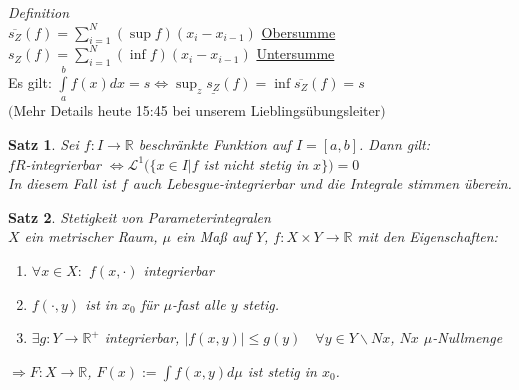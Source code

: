 \documentclass[11pt]{memoir}
\theoremstyle{changebreak}
\newtheorem{Satz}{Satz}[chapter]
\begin{document}
\emph{Definition} \\
$\overline{s_Z}(f) = \sum\limits_{i=1}^N (\sup f)(x_i  - x_{i-1})$ \underline{Obersumme} \\
\underline{$s_Z$}$(f) = \sum\limits_{i=1}^N (\inf f)(x_i - x_{i-1})$ \underline{Untersumme} \\
Es gilt:
$\int\limits_a^b f(x) dx = s \Leftrightarrow \sup_z \underline{s_Z}(f) = \inf \overline{s_Z}(f) = s$ \\
$($Mehr Details heute 15:45 bei unserem Lieblingsübungsleiter$)$

\begin{Satz}
Sei $f: I \rightarrow \mathbb R$ beschränkte Funktion auf $I = [a, b]$. Dann gilt: \\
$f R$-integrierbar $\Leftrightarrow \mathscr L^1(\{x \in I | f $ ist nicht stetig in $x \}) = 0$ \\
In diesem Fall ist $f$ auch Lebesgue-integrierbar und die Integrale stimmen überein.
\end{Satz}



\begin{Satz}
\emph{Stetigkeit von Parameterintegralen} \\
$X$ ein metrischer Raum, $\mu$ ein Maß auf $Y$, $f: X \times Y \rightarrow \mathbb R$ mit den Eigenschaften:
\begin{enumerate}
	\item $\forall x \in X:$ $f(x, \cdotp)$ integrierbar
	\item $f(\cdotp, y)$ ist in $x_0$ für $\mu$-fast alle $y$ stetig.
	\item $\exists g: Y \rightarrow \mathbb R^+$ integrierbar, $|f(x, y)| \leq g(y)\quad \forall y \in Y \backslash Nx$, $Nx$ $\mu$-Nullmenge
\end{enumerate}
$\Rightarrow F: X \rightarrow \mathbb R$, $F(x):= \int f(x, y) d\mu$ ist stetig in $x_0$.
\end{Satz}
\end{document}
